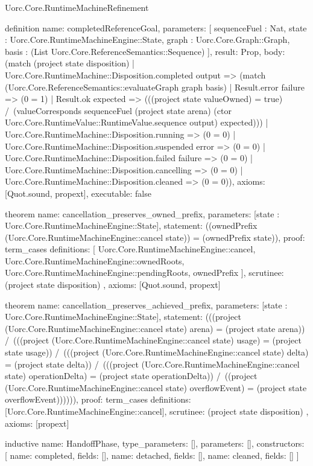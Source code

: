 \begin{lexlean}{Uorc.Core.RuntimeMachineRefinement}
\begin{semanticmodule}
definition{
  name: completedReferenceGoal,
  parameters: [
    sequenceFuel : Nat,
    state : Uorc.Core.RuntimeMachineEngine::State,
    graph : Uorc.Core.Graph::Graph,
    basis : (List Uorc.Core.ReferenceSemantics::Sequence)
  ],
  result: Prop,
  body: (match (project state disposition)
    | Uorc.Core.RuntimeMachine::Disposition.completed output => (match (Uorc.Core.ReferenceSemantics::evaluateGraph graph basis)
      | Result.error failure => (0 = 1)
      | Result.ok expected => (((project state valueOwned) = true) /\ (valueCorresponds sequenceFuel (project state arena) (ctor Uorc.Core.RuntimeValue::RuntimeValue.sequence output) expected)))
    | Uorc.Core.RuntimeMachine::Disposition.running => (0 = 0)
    | Uorc.Core.RuntimeMachine::Disposition.suspended error => (0 = 0)
    | Uorc.Core.RuntimeMachine::Disposition.failed failure => (0 = 0)
    | Uorc.Core.RuntimeMachine::Disposition.cancelling => (0 = 0)
    | Uorc.Core.RuntimeMachine::Disposition.cleaned => (0 = 0)),
  axioms: [Quot.sound, propext],
  executable: false
}

theorem{
  name: cancellation_preserves_owned_prefix,
  parameters: [state : Uorc.Core.RuntimeMachineEngine::State],
  statement: ((ownedPrefix (Uorc.Core.RuntimeMachineEngine::cancel state)) = (ownedPrefix state)),
  proof: term_cases{
    definitions: [
      Uorc.Core.RuntimeMachineEngine::cancel,
      Uorc.Core.RuntimeMachineEngine::ownedRoots,
      Uorc.Core.RuntimeMachineEngine::pendingRoots,
      ownedPrefix
    ],
    scrutinee: (project state disposition)
  },
  axioms: [Quot.sound, propext]
}

theorem{
  name: cancellation_preserves_achieved_prefix,
  parameters: [state : Uorc.Core.RuntimeMachineEngine::State],
  statement: (((project (Uorc.Core.RuntimeMachineEngine::cancel state) arena) = (project state arena)) /\ (((project (Uorc.Core.RuntimeMachineEngine::cancel state) usage) = (project state usage)) /\ (((project (Uorc.Core.RuntimeMachineEngine::cancel state) delta) = (project state delta)) /\ (((project (Uorc.Core.RuntimeMachineEngine::cancel state) operationDelta) = (project state operationDelta)) /\ ((project (Uorc.Core.RuntimeMachineEngine::cancel state) overflowEvent) = (project state overflowEvent)))))),
  proof: term_cases{
    definitions: [Uorc.Core.RuntimeMachineEngine::cancel],
    scrutinee: (project state disposition)
  },
  axioms: [propext]
}

inductive{
  name: HandoffPhase,
  type_parameters: [],
  parameters: [],
  constructors: [
    {name: completed, fields: []},
    {name: detached, fields: []},
    {name: cleaned, fields: []}
  ]
}


\end{semanticmodule}
\end{lexlean}
